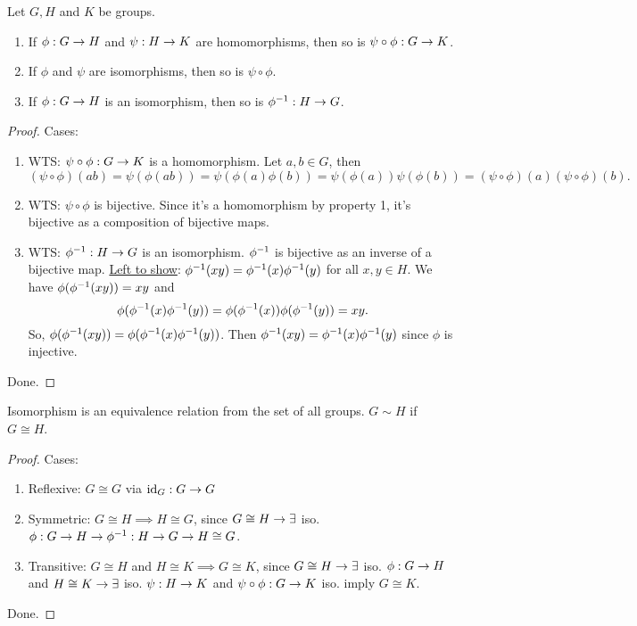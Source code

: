 \documentclass[]{article}
\begin{document}
\begin{theorem}
	Let $G,H$ and $K$ be groups.
	\begin{enumerate}
		\item If $\phi:G\rightarrow H$ and $\psi:H\rightarrow K$ are homomorphisms, then so is $\psi\circ\phi:G\rightarrow K$.
		\item If $\phi$ and $\psi$ are isomorphisms, then so is $\psi\circ\phi$.
		\item If $\phi:G\rightarrow H$ is an isomorphism, then so is $\phi^{-1}:H\rightarrow G$.
	\end{enumerate}
\end{theorem}
\begin{proof}
	Cases:
	\begin{enumerate}
		\item WTS: $\psi\circ\phi:G\rightarrow K$ is a homomorphism.
			Let $a,b\in G$, then $$(\psi\circ\phi)(ab) = \psi(\phi(ab)) = \psi(\phi(a)\phi(b)) = \psi(\phi(a))\psi(\phi(b)) = (\psi\circ\phi)(a)(\psi\circ\phi)(b).$$
		\item WTS: $\psi\circ\phi$ is bijective.
			Since it's a homomorphism by property 1, it's bijective as a composition of bijective maps.
		\item WTS: $\phi^{-1}:H\rightarrow G$ is an isomorphism.
			$\phi^{-1}$ is bijective as an inverse of a bijective map.
			\ul{Left to show}: $\phi^{-1}(xy) = \phi^{-1}(x)\phi^{-1}(y)$ for all $x,y\in H$.
			We have $\phi(\phi^{-1}(xy)) = xy$ and $$\phi(\phi^{-1}(x)\phi^{-1}(y)) = \phi(\phi^{-1}(x))\phi(\phi^{-1}(y)) = xy.$$
			So, $\phi(\phi^{-1}(xy)) = \phi(\phi^{-1}(x)\phi^{-1}(y))$.
			Then $\phi^{-1}(xy) = \phi^{-1}(x)\phi^{-1}(y)$ since $\phi$ is injective.
	\end{enumerate}
	Done.
\end{proof}


\begin{theorem}
	Isomorphism is an equivalence relation from the set of all groups.
	$G\sim H$ if $G\cong H$.
\end{theorem}
\begin{proof}
	Cases:
	\begin{enumerate}
		\item Reflexive: $G\cong G$ via $\text{id}_G:G\rightarrow G$
		\item Symmetric: $G\cong H\implies H\cong G$, since $G\cong H\rightarrow \exists$ iso. $\phi:G\rightarrow H \rightarrow \phi^{-1}:H\rightarrow G \rightarrow H\cong G$.
		\item Transitive: $G\cong H$ and $H\cong K \implies G\cong K$, since $G\cong H \rightarrow \exists$ iso. $\phi:G\rightarrow H$ and $H\cong K\rightarrow \exists$ iso. $\psi:H\rightarrow K$ and $\psi\circ\phi:G\rightarrow K$ iso. imply $G\cong K$.
	\end{enumerate}
	Done.
\end{proof}
\end{document}
